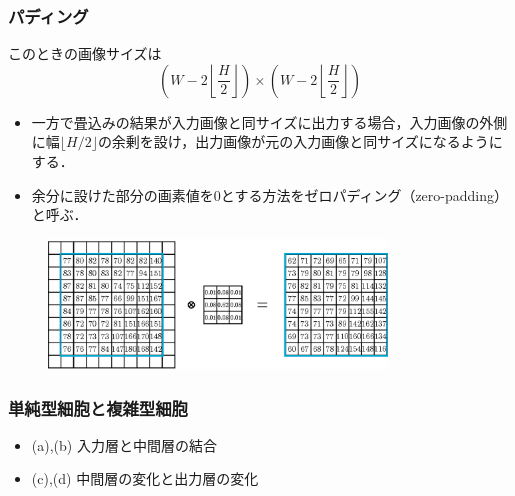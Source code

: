 \documentclass[dvipdfmx,11pt,notheorems]{beamer}
\theoremstyle{definition}
\begin{document}
\begin{frame}[fragile]\frametitle{パディング}
\begin{block}{このときの画像サイズは}
\begin{equation}
  \left(W-2\left\lfloor \frac{H}{2}\right\rfloor\right)\times \left(W-2\left\lfloor \frac{H}{2}\right\rfloor\right)
\end{equation}
\end{block}
\begin{itemize}
\item 一方で畳込みの結果が入力画像と同サイズに出力する場合，入力画像の外側に幅$\lfloor H/2\rfloor$の余剰を設け，出力画像が元の入力画像と同サイズになるようにする．
\item 余分に設けた部分の画素値を0とする方法をゼロパディング（zero-padding）と呼ぶ．
\end{itemize}

\begin{figure}[t]
  \begin{center}
    \includegraphics[clip,width=9cm]{fig/eps/zero_padding.eps}
  \end{center}
\end{figure}
\end{frame}



\begin{frame}[fragile]\frametitle{単純型細胞と複雑型細胞}

\begin{itemize}
\item (a),(b) 入力層と中間層の結合
\item (c),(d) 中間層の変化と出力層の変化
\end{itemize}

\end{frame}
\end{document}
